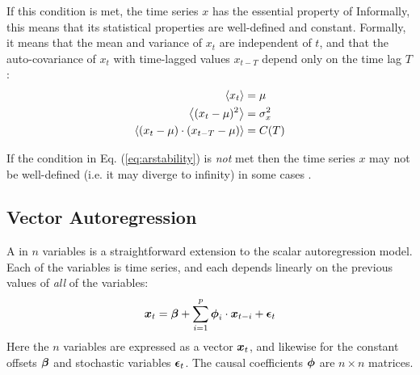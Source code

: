     If this condition is met, the time series $x$ has the essential property of
      Informally, this means that its statistical
    properties are well-defined and constant.  Formally, it means that
    the mean and variance of $x_t$ are independent of $t$, and that the auto-covariance
    of $x_t$ with time-lagged values $x_{t-T}$ depend only on the time lag $T$ \cite{juselius}:
    \begin{align} \label{eq:stationarity}
        \left< x_t \right> &= \mu \\
        \left< (x_t - \mu)^2 \right> &= \sigma_x^2 \\
        \left< (x_t - \mu) \cdot (x_{t-T} - \mu) \right> &= C(T)
    \end{align}
    
    If the condition in Eq. (\ref{eq:arstability}) is \emph{not} met then
    the time series $x$ may not be well-defined (i.e. it may diverge to infinity)
    in some cases \cite{dickey}.

\subsection{Vector Autoregression}

    A  in $n$ variables is a straightforward 
    extension to the scalar autoregression model.  Each of the variables
    is time series, and each depends linearly on the previous values of \emph{all}
    of the variables:
    \begin{equation} \label{eq:vardef}
        \boldsymbol{x}_t
        = \boldsymbol{\beta} + \sum_{i=1}^{p} \boldsymbol{\phi}_{i} \cdot \boldsymbol{x}_{t-i} + \boldsymbol{\epsilon}_t
    \end{equation}
    Here the $n$ variables are expressed as a vector $\boldsymbol{x}_t$, and likewise 
    for the constant offsets $\boldsymbol{\beta}$ and stochastic variables 
    $\boldsymbol{\epsilon}_t$.  The causal coefficients $\boldsymbol{\phi}$ are $n \times n$ 
    matrices.
    

